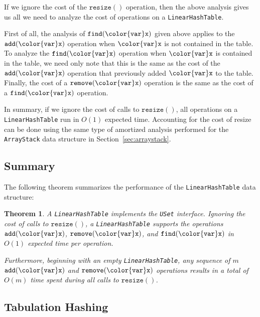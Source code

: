 \documentclass[10pt]{book}
\newcommand{\seclabel}[1]{\label{sec:#1}}
\newcommand{\secref}[1]{Section~\ref{sec:#1}}
\theoremstyle{plain}
\newtheorem{thm}{Theorem}[chapter]
\newcommand{\thmlabel}[1]{\label{thm:#1}}
\theoremstyle{definition}
\begin{document}
If we ignore the cost of the \ensuremath{\mathtt{resize()}} operation, then the above
analysis gives us all we need to analyze the cost of operations on a
\texttt{LinearHashTable}.

First of all, the analysis of \ensuremath{\mathtt{find({\color{var}x})}} given above applies to the
\ensuremath{\mathtt{add({\color{var}x})}} operation when \ensuremath{\mathtt{{\color{var}x}}} is not contained in the table.  To analyze
the \ensuremath{\mathtt{find({\color{var}x})}} operation when \ensuremath{\mathtt{{\color{var}x}}} is contained in the table, we need only
note that this is the same as the cost of the \ensuremath{\mathtt{add({\color{var}x})}} operation that
previously added \ensuremath{\mathtt{{\color{var}x}}} to the table.  Finally, the cost of a \ensuremath{\mathtt{remove({\color{var}x})}}
operation is the same as the cost of a \ensuremath{\mathtt{find({\color{var}x})}} operation.

In summary, if we ignore the cost of calls to \ensuremath{\mathtt{resize()}}, all operations
on a \texttt{LinearHashTable} run in $O(1)$ expected time.  Accounting for the
cost of resize can be done using the same type of amortized analysis
performed for the \texttt{ArrayStack} data structure in \secref{arraystack}.

\subsection{Summary}

The following theorem summarizes the performance of the \texttt{LinearHashTable}
data structure:

\begin{thm}\thmlabel{linear-probing}
  A \texttt{LinearHashTable} implements the \texttt{USet} interface.  Ignoring the
  cost of calls to \ensuremath{\mathtt{resize()}}, a \texttt{LinearHashTable} supports the operations
  \ensuremath{\mathtt{add({\color{var}x})}}, \ensuremath{\mathtt{remove({\color{var}x})}}, and \ensuremath{\mathtt{find({\color{var}x})}} in $O(1)$ expected time per
  operation.  

  Furthermore, beginning with an empty \texttt{LinearHashTable}, any
  sequence of $m$ \ensuremath{\mathtt{add({\color{var}x})}} and \ensuremath{\mathtt{remove({\color{var}x})}} operations results in a total
  of $O(m)$ time spent during all calls to \ensuremath{\mathtt{resize()}}.
\end{thm}

\subsection{Tabulation Hashing}
\seclabel{tabulation}
\end{document}
